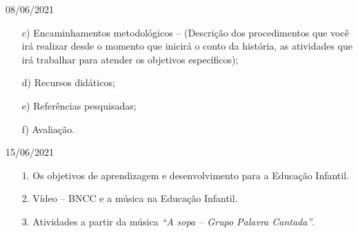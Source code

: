 \documentclass{SchoolBook}
\begin{document}
\begin{day}{08/06/2021}
\begin{enumerate}
            \item[c)] Encaminhamentos metodológicos -- (Descrição dos procedimentos que você irá realizar desde o momento que inicirá o conto da história, as atividades que irá trabalhar para atender os objetivos específicos);
            
            \item[d)] Recursos didáticos;
            \item[e)] Referências pesquisadas;
            \item[f)] Avaliação.
        \end{enumerate}
    \end{day}
    
    \begin{day}{15/06/2021}
        \begin{enumerate}
            \item[1.] Os objetivos de aprendizagem e desenvolvimento para a Educação Infantil.
            \item[2.] Vídeo -- BNCC e a música na Educação Infantil.
            \item[3.] Atividades a partir da música \emph{``A sopa -- Grupo Palavra Cantada''}.
        \end{enumerate}
    \end{day}
    
\end{document}

